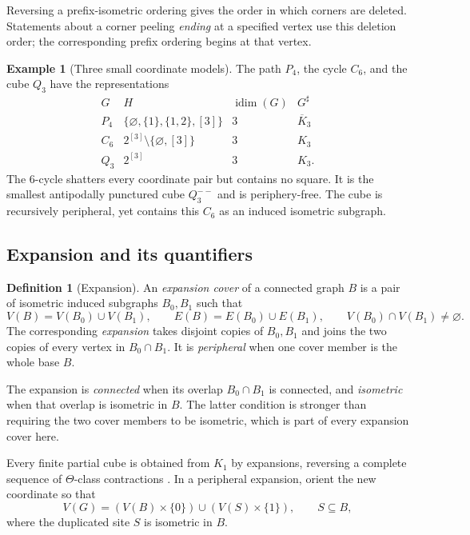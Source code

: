 \documentclass[11pt]{article}
\theoremstyle{definition}
\newtheorem{definition}[theorem]{Definition}
\newtheorem{example}[theorem]{Example}
\theoremstyle{remark}
\newcommand{\idim}{\operatorname{idim}}
\begin{document}
Reversing a prefix-isometric ordering gives the order in which corners are
deleted. Statements about a corner peeling \emph{ending} at a specified
vertex use this deletion order; the corresponding prefix ordering begins
at that vertex.

\begin{example}[Three small coordinate models]
\label{ex:small-models}
The path \(P_4\), the cycle \(C_6\), and the cube \(Q_3\) have the
representations
\[
\begin{array}{c|c|c|c}
G&H&\idim(G)&G^\sharp\\ \hline
P_4&\{\varnothing,\{1\},\{1,2\},[3]\}&3&\overline K_3\\
C_6&2^{[3]}\setminus\{\varnothing,[3]\}&3&K_3\\
Q_3&2^{[3]}&3&K_3.
\end{array}
\]
The \(6\)-cycle shatters every coordinate pair but contains no square.  It
is the smallest antipodally punctured cube \(Q_3^{--}\) and is
periphery-free.  The cube is recursively peripheral, yet contains this
\(C_6\) as an induced isometric subgraph.
\end{example}

\subsection{Expansion and its quantifiers}

\begin{definition}[Expansion]
\label{def:expansion}
An \emph{expansion cover} of a connected graph \(B\) is a pair of isometric
induced subgraphs \(B_0,B_1\) such that
\[
 V(B)=V(B_0)\cup V(B_1),\qquad
 E(B)=E(B_0)\cup E(B_1),\qquad
 V(B_0)\cap V(B_1)\ne\varnothing.
\]
The corresponding \emph{expansion} takes disjoint copies of \(B_0,B_1\) and
joins the two copies of every vertex in \(B_0\cap B_1\).  It is
\emph{peripheral} when one cover member is the whole base \(B\).
\end{definition}

The expansion is \emph{connected} when its overlap \(B_0\cap B_1\) is
connected, and \emph{isometric} when that overlap is isometric in \(B\).
The latter condition is stronger than requiring the two cover members to
be isometric, which is part of every expansion cover here.

Every finite partial cube is obtained from \(K_1\) by expansions, reversing
a complete sequence of \(\Theta\)-class contractions
\cite[Theorem~3.1]{ImrichKlavzar98}.  In a peripheral expansion, orient the
new coordinate so that
\begin{equation}
 V(G)=(V(B)\times\{0\})\cup(V(S)\times\{1\}),
 \qquad S\subseteq B,
 \label{eq:peripheral-form}
\end{equation}
where the duplicated site \(S\) is isometric in \(B\).
\end{document}
